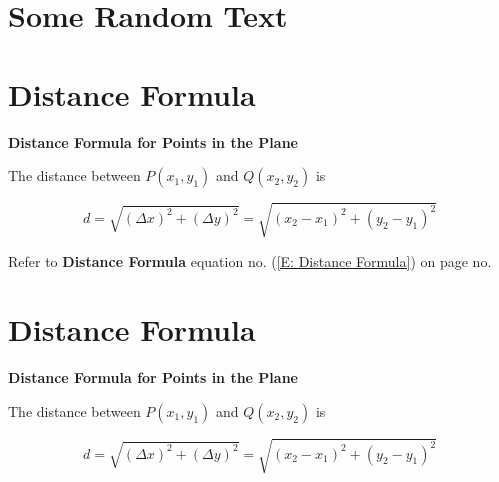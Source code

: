 \documentclass{article}
\numberwithin{equation}{section}
\begin{document}
	
	\section{Some Random Text}
	\lipsum
	\clearpage
	
	\section{Distance Formula} 

	\par \textbf{Distance Formula for Points in the Plane}	\\
	
	\par The distance between $P(x_1, y_1)$ and $Q(x_2, y_2)$ is
	
	\begin{equation}\label{E: Distance Formula}
		d = \sqrt{(\Delta x)^2 + (\Delta y)^2} = \sqrt{(x_2 - x_1)^2 + (y_2 - y_1)^2}
	\end{equation}
		
	\par Refer to \textbf{Distance Formula} equation no. (\ref{E: Distance Formula}) on page no. \pageref{E: Distance Formula}
	
	
	\section{Distance Formula} 
	
	\par \textbf{Distance Formula for Points in the Plane}	\\
	
	\par The distance between $P(x_1, y_1)$ and $Q(x_2, y_2)$ is
	
	\begin{equation}\tag{Distance Formula}
	d = \sqrt{(\Delta x)^2 + (\Delta y)^2} = \sqrt{(x_2 - x_1)^2 + (y_2 - y_1)^2}
	\end{equation}
	 
	
\end{document}
